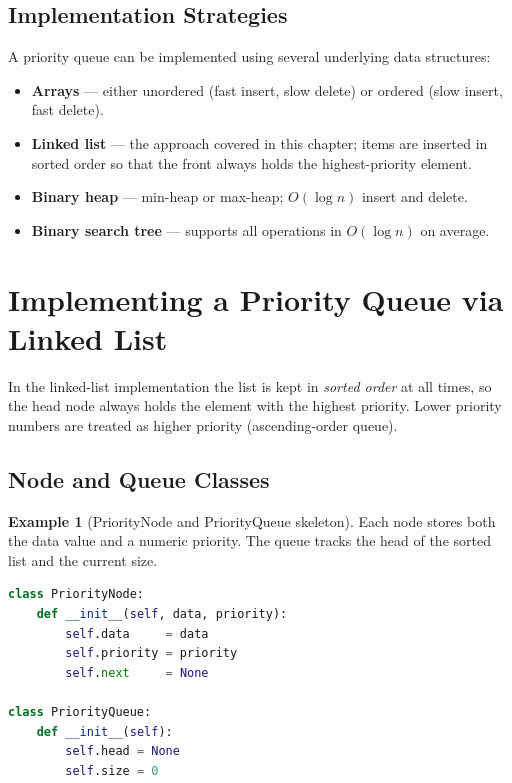 \documentclass[11pt, a4paper, notitlepage]{report}
\theoremstyle{definition}
\theoremstyle{remark}
\theoremstyle{definition}
\newtheorem{example}[theorem]{Example}
\begin{document}
\subsection{Implementation Strategies}
\label{subsec:pq-implementations}

A priority queue can be implemented using several underlying data structures:
\begin{itemize}
  \item \textbf{Arrays} --- either unordered (fast insert, slow delete) or ordered (slow
        insert, fast delete).
  \item \textbf{Linked list} --- the approach covered in this chapter; items are inserted in
        sorted order so that the front always holds the highest-priority element.
  \item \textbf{Binary heap} --- min-heap or max-heap; $O(\log n)$ insert and delete.
  \item \textbf{Binary search tree} --- supports all operations in $O(\log n)$ on average.
\end{itemize}

\section{Implementing a Priority Queue via Linked List}
\label{sec:pq-linked-list}

In the linked-list implementation the list is kept in \emph{sorted order} at all times,
so the head node always holds the element with the highest priority.  Lower priority numbers
are treated as higher priority (ascending-order queue).

\subsection{Node and Queue Classes}
\label{subsec:pq-classes}

\begin{example}[PriorityNode and PriorityQueue skeleton]
\label{ex:pq-classes}
Each node stores both the data value and a numeric priority.  The queue tracks the head of the
sorted list and the current size.
\begin{lstlisting}[language=Python]
class PriorityNode:
    def __init__(self, data, priority):
        self.data     = data
        self.priority = priority
        self.next     = None

class PriorityQueue:
    def __init__(self):
        self.head = None
        self.size = 0
\end{lstlisting}
\end{example}
\end{document}
